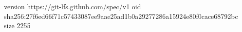version https://git-lfs.github.com/spec/v1
oid sha256:27f6ed66f71c57433087ee9aae25ad1b0a29277286a15924e80f0cace68792bc
size 2255
